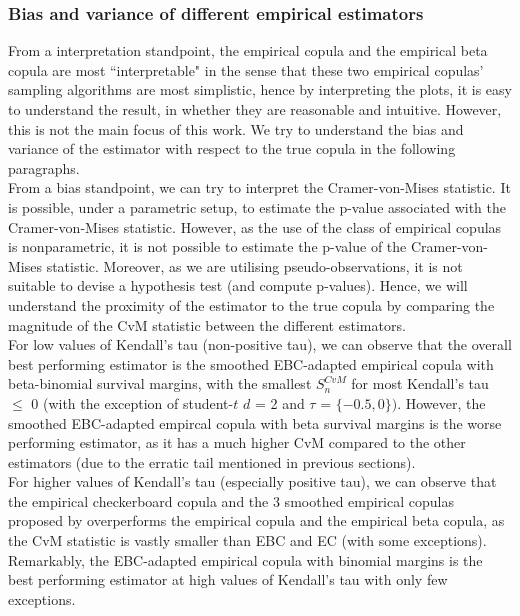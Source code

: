 \documentclass[12pt]{report}
\newcommand{\1}{\mathbf{1}}
\begin{document}
\begin{flushleft}
\subsubsection{Bias and variance of different empirical estimators}
From a interpretation standpoint, the empirical copula and the empirical beta copula are most ``interpretable" in the sense that these two empirical copulas' sampling algorithms are most simplistic, hence by interpreting the plots, it is easy to understand the result, in whether they are reasonable and intuitive. However, this is not the main focus of this work. We try to understand the bias and variance of the estimator with respect to the true copula in the following paragraphs.\\ 
\vspace{0.5cm}
From a bias standpoint, we can try to interpret the Cramer-von-Mises statistic. It is possible, under a parametric setup, to estimate the p-value associated with the Cramer-von-Mises statistic. However, as the use of the class of empirical copulas is nonparametric, it is not possible to estimate the p-value of the Cramer-von-Mises statistic. Moreover, as we are utilising pseudo-observations, it is not suitable to devise a hypothesis test (and compute p-values). Hence, we will understand the proximity of the estimator to the true copula by comparing the magnitude of the CvM statistic between the different estimators.\\
\vspace{0.5cm}
For low values of Kendall's tau (non-positive tau), we can observe that the overall best performing estimator is the smoothed EBC-adapted empirical copula with beta-binomial survival margins, with the smallest $S^{CvM}_{n}$ for most Kendall's tau $\le$ 0 (with the exception of student-$t$ $d$ = 2 and $\tau$ = $\{-0.5, 0\})$. However, the smoothed EBC-adapted empircal copula with beta survival margins is the worse performing estimator, as it has a much higher CvM compared to the other estimators (due to the erratic tail mentioned in previous sections).\\
\vspace{0.5cm}
For higher values of Kendall's tau (especially positive tau), we can observe that the empirical checkerboard copula and the 3 smoothed empirical copulas proposed by \cite{KojadinovicYi2024Smooth} overperforms the empirical copula and the empirical beta copula, as the CvM statistic is vastly smaller than EBC and EC (with some exceptions). Remarkably, the EBC-adapted empirical copula with binomial margins is the best performing estimator at high values of Kendall's tau with only few exceptions.\\

\end{flushleft}
\end{document}
